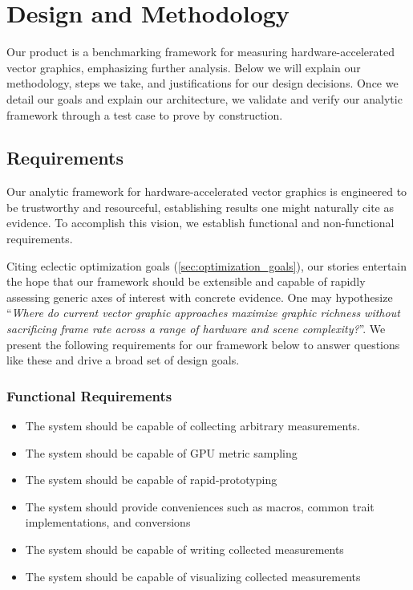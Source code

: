 \section{Design and Methodology}\label{sec:methodology}
Our product is a benchmarking framework for measuring hardware-accelerated vector graphics, emphasizing further analysis. Below we will explain our methodology, steps we take, and justifications for our design decisions. Once we detail our goals and explain our architecture, we validate and verify our analytic framework through a test case to prove by construction.\medskip

\subsection{Requirements}
Our analytic framework for hardware-accelerated vector graphics is engineered to be trustworthy and resourceful, establishing results one might naturally cite as evidence. To accomplish this vision, we establish functional and non-functional requirements.\medskip

Citing eclectic optimization goals (\cref{sec:optimization_goals}), our stories entertain the hope that our framework should be extensible and capable of rapidly assessing generic axes of interest with concrete evidence. One may hypothesize ``\textit{Where do current vector graphic approaches maximize graphic richness without sacrificing frame rate across a range of hardware and scene complexity?}''. We present the following requirements for our framework below to answer questions like these and drive a broad set of design goals.\medskip

\subsubsection{Functional Requirements}
\begin{itemize}
	\item The system should be capable of collecting arbitrary measurements.
	\item The system should be capable of GPU metric sampling
	\item The system should be capable of rapid-prototyping
	\item The system should provide conveniences such as macros, common trait implementations, and conversions
	\item The system should be capable of writing collected measurements
	\item The system should be capable of visualizing collected measurements
\end{itemize}

